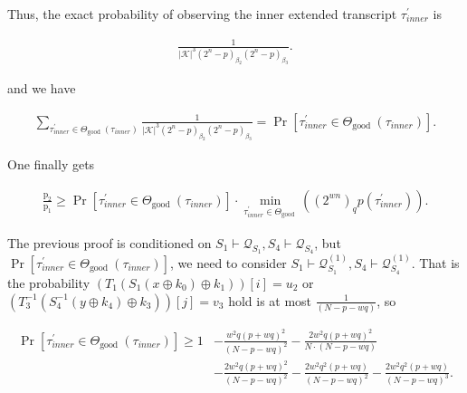 Thus, the exact probability of observing the inner extended transcript $\tau_{inner}^{\prime}$ is

$$
\begin{aligned}
\frac{1}{|\mathcal{K}|^{3}\left(2^{n}-p\right)_{\beta_{2}}\left(2^{n}-p\right)_{\beta_{3}}}.
\end{aligned}
$$

and we have

$$
\begin{aligned}
\sum_{\tau_{inner}^{\prime} \in \Theta_{\text {good }}(\tau_{inner})} \frac{1}{|\mathcal{K}|^{3}\left(2^{n}-p\right)_{\beta_{2}}\left(2^{n}-p\right)_{\beta_{3}}} = \operatorname{Pr}\left[ \tau_{inner}^{\prime} \in \Theta_{\text {good }}(\tau_{inner})\right].
\end{aligned}
$$

One finally gets

\begin{equation}
\begin{aligned}
\frac{\mathrm{p}_{2}}{\mathrm{p}_{1}} \geq \operatorname{Pr}\left[ \tau_{inner}^{\prime} \in \Theta_{\text {good }}(\tau_{inner})\right] \cdot \min _{\tau_{inner}^{\prime} \in \Theta_{\text {good }}}((2^{w n})_{q} p(\tau_{inner}^{\prime})).
\end{aligned}
\end{equation}

The previous proof is conditioned on $S_{1} \vdash \mathcal{Q}_{S_{1}}, S_{4} \vdash \mathcal{Q}_{S_{4}}$, but $\operatorname{Pr}\left[ \tau_{inner}^{\prime} \in \Theta_{\text {good }}(\tau_{inner})\right]$, we need to consider $S_{1} \vdash \mathcal{Q}_{S_{1}}^{(1)}, S_{4} \vdash \mathcal{Q}_{S_{4}}^{(1)}$. That is the probability $\left(T_{1}\left(S_{1}\left(x \oplus k_{0}\right) \oplus k_{1}\right)\right)[i]=u_2$ or $\left(T_{3}^{-1}\left(S_{4}^{-1}\left(y \oplus k_{4}\right) \oplus k_{3}\right)\right)[j]=v_3$ hold is at most $\frac{1}{(N-p-w q)}$, so

\begin{equation}
\begin{aligned}
\operatorname{Pr}\left[ \tau_{inner}^{\prime} \in \Theta_{\text {good }}(\tau_{inner})\right] \geq 1&- \frac{w^{2} q (p+w q)^{2}}{(N-p-w q)^{2}} -\frac{2 w^{2} q (p+w q)^{2}}{N \cdot (N-p-w q)}\\
&- \frac{2 w^{2} q (p+w q)^{2}}{(N-p- wq)^2} - \frac{2 w^{2} q^{2} (p+w q)}{(N-p- wq)^2} - \frac{2 w^{2} q^{2} (p+w q)}{(N-p- wq)^3}.
\end{aligned}
\end{equation}


